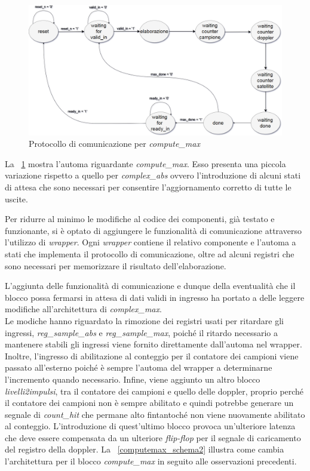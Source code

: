 \documentclass[12pt,a4paper,twoside,openany]{book}
\begin{document}
\clearpage
\begin{figure}
\begin{center}
\includegraphics[scale=0.28, keepaspectratio]{immagini/fsm_wrapper_max}
\caption{Protocollo di comunicazione per \textit{compute\_max}}
\label{wrappermax_fsm}
\end{center}
\end{figure}

La \figurename~\ref{wrappermax_fsm} mostra l'automa riguardante \textit{compute\_max}. Esso presenta una piccola variazione rispetto a quello per \textit{complex\_abs} ovvero l'introduzione di alcuni stati di attesa che sono necessari per consentire l'aggiornamento corretto di tutte le uscite.

Per ridurre al minimo le modifiche al codice dei componenti, già testato e funzionante, si è optato di aggiungere le funzionalità di comunicazione attraverso l'utilizzo di \textit{wrapper}. Ogni \textit{wrapper} contiene il relativo componente e l'automa a stati che implementa il protocollo di comunicazione, oltre ad alcuni registri che sono necessari per memorizzare il risultato dell'elaborazione.

L'aggiunta delle funzionalità di comunicazione e dunque della eventualità che il blocco possa fermarsi in attesa di dati validi in ingresso ha portato a delle leggere modifiche all'architettura di \textit{complex\_max}.\\
Le modiche hanno riguardato la rimozione dei registri usati per ritardare gli ingressi, \textit{reg\_sample\_abs} e \textit{reg\_sample\_max}, poiché il ritardo necessario a mantenere stabili gli ingressi viene fornito direttamente dall'automa nel wrapper. Inoltre, l'ingresso di abilitazione al conteggio per il contatore dei campioni viene passato all'esterno poiché è sempre l'automa del wrapper a determinarne l'incremento quando necessario. Infine, viene aggiunto un altro blocco \textit{livelli2impulsi}, tra il contatore dei campioni e quello delle doppler, proprio perché il contatore dei campioni non è sempre abilitato e quindi potrebbe generare un segnale di \textit{count\_hit} che permane alto fintantoché non viene nuovamente abilitato al conteggio. L'introduzione di quest'ultimo blocco provoca un'ulteriore latenza che deve essere compensata da un ulteriore \textit{flip-flop} per il segnale di caricamento del registro della doppler. La \figurename~\ref{computemax_schema2} illustra come cambia l'architettura per il blocco \textit{compute\_max} in seguito alle osservazioni precedenti.
\end{document}
